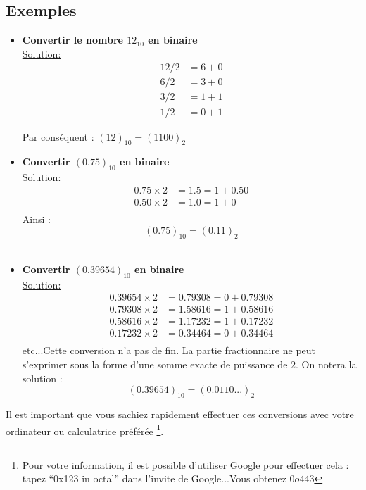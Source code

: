 \subsection{Exemples}
\begin{itemize}
\item {\bf Convertir le nombre $12_{10}$ en binaire}\\
\underline{Solution:}\\
\begin{align*}
 12 / 2 &= 6 + 0 \\
  6 / 2 &= 3 + 0 \\
  3 /2  &= 1 + 1 \\
  1 / 2 &= 0 + 1
\end{align*}

Par conséquent :
$( 12 )_{10} = ( 1100 )_2$\\

\item {\bf Convertir $( 0.75)_{10}$ en binaire}\\
\underline{Solution:}\\
\begin{align*}
0.75 \times 2 &= 1.5 = 1 + 0.50 \\
0.50 \times 2 &= 1.0 = 1 + 0 \\
\end{align*}
Ainsi : $$( 0.75)_{10} = ( 0.11)_{2}$$\\

\item {\bf Convertir $( 0.39654 )_{10}$ en binaire}\\
\underline{Solution:}\\
\begin{align*}
0.39654 \times 2 &= 0.79308 = 0 + 0.79308 \\
0.79308 \times 2 &= 1.58616 = 1 + 0.58616 \\
0.58616 \times 2 &= 1.17232 = 1 + 0.17232 \\
0.17232 \times 2 &= 0.34464 = 0 + 0.34464 \\
\end{align*}
etc...Cette conversion n'a pas de fin. La partie fractionnaire ne peut s'exprimer sous la forme d'une somme exacte de puissance de $2$. On notera la solution :
$$( 0.39654 )_10 = ( 0.0110... )_2$$
\end{itemize}

Il est important que vous sachiez rapidement effectuer ces conversions avec votre ordinateur ou calculatrice préférée
\footnote{Pour votre information, il est possible d'utiliser Google pour effectuer cela : tapez ``0x123 in octal'' dans l'invite de Google...Vous obtenez $0o443$}.

